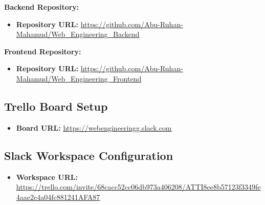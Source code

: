 \documentclass[12pt,a4paper]{article}
\begin{document}
\textbf{Backend Repository:}
\begin{itemize}[itemsep=0.1cm]
    \item \textbf{Repository URL:} \url{https://github.com/Abu-Ruhan-Mahamud/Web_Engineering_Backend}
\end{itemize}

\noindent
\textbf{Frontend Repository:}
\begin{itemize}[itemsep=0.1cm]
    \item \textbf{Repository URL:} \url{https://github.com/Abu-Ruhan-Mahamud/Web_Engineering_Frontend}
\end{itemize}

\subsection{Trello Board Setup}

\begin{itemize}[itemsep=0.1cm]
    \item \textbf{Board URL:} \url{https://webengineeringg.slack.com}
\end{itemize}

\subsection{Slack Workspace Configuration}

\begin{itemize}[itemsep=0.1cm]
    \item \textbf{Workspace URL:} \url{https://trello.com/invite/68cacc52cc06db973a406208/ATTI8ee8b57123f3349fe4aae2e4a04fc881241AFA87}
\end{itemize}
\end{document}
